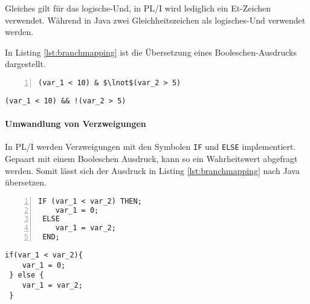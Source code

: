 Gleiches gilt für das logische-Und, in PL/I wird lediglich ein Et-Zeichen verwendet. Während in Java zwei Gleichheitszeichen als logisches-Und verwendet werden.

In Listing \ref{lst:branchmapping} ist die Übersetzung eines Booleschen-Ausdrucks dargestellt.

\begin{minipage}[b]{0.48\linewidth}
	\centering
	\lstset{language=PL/I,label=SliceExaple}
	\begin{lstlisting}[frame=single, numbers=left, mathescape,%
		caption={Boolescher Ausdruck}, label={lst:branchmapping}]	
 (var_1 < 10) & $\lnot$(var_2 > 5)
	\end{lstlisting}
\end{minipage}
\hspace{0.5cm}
\begin{minipage}[b]{0.48\linewidth}
	\centering
	\lstset{language=Java,label=SliceExaple}
	\begin{lstlisting}[frame=single, mathescape,%
		title={" "}]
 (var_1 < 10) && !(var_2 > 5)
	\end{lstlisting}
\end{minipage}
\pagebreak

\paragraph*{Umwandlung von Verzweigungen}

In PL/I werden Verzweigungen mit den Symbolen \verb+IF+ und \verb+ELSE+ implementiert. 
Gepaart mit einem Booleschen Ausdruck, kann so ein Wahrheitswert abgefragt werden.
Somit lässt sich der Ausdruck in Listing \ref{lst:branchmapping} nach Java übersetzen.

\begin{minipage}[b]{0.48\linewidth}
	\centering
	\lstset{language=PL/I,label=SliceExaple}
	\begin{lstlisting}[frame=single, numbers=left, mathescape,%
		caption={Transformation Verzweigungen}, label={lst:branchmapping}]	
 IF (var_1 < var_2) THEN;
 	var_1 = 0;
 ELSE
 	var_1 = var_2;
 END;
	\end{lstlisting}
\end{minipage}
\hspace{0.5cm}
\begin{minipage}[b]{0.48\linewidth}
	\centering
	\lstset{language=Java,label=SliceExaple}
	\begin{lstlisting}[frame=single, mathescape,%
		title={" "}]
 if(var_1 < var_2){
 	var_1 = 0;	
 } else {
	var_1 = var_2;
 }
	\end{lstlisting}
\end{minipage} 


